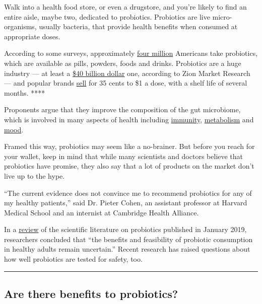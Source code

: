 Walk into a health food store, or even a drugstore, and you're likely to
find an entire aisle, maybe two, dedicated to probiotics. Probiotics are
live micro-organisms, usually bacteria, that provide health benefits
when consumed at appropriate doses.

According to some surveys, approximately
\href{https://nccih.nih.gov/research/statistics/NHIS/2012/natural-products/biotics}{four
million} Americans take probiotics, which are available as pills,
powders, foods and drinks. Probiotics are a huge industry --- at least a
\href{https://www.zionmarketresearch.com/report/probiotics-market}{\$40
billion dollar} one, according to Zion Market Research --- and popular
brands \href{https://smile.amazon.com/s?k=probiotics}{sell} for 35 cents
to \$1 a dose, with a shelf life of several months. ****

Proponents argue that they improve the composition of the gut
microbiome, which is involved in many aspects of health including
\href{https://www.ncbi.nlm.nih.gov/pubmed/27383981}{immunity},
\href{https://www.ncbi.nlm.nih.gov/pubmed/22674330}{metabolism} and
\href{https://www.ncbi.nlm.nih.gov/pubmed/27814521}{mood}.

Framed this way, probiotics may seem like a no-brainer. But before you
reach for your wallet, keep in mind that while many scientists and
doctors believe that probiotics have promise, they also say that a lot
of products on the market don't live up to the hype.

``The current evidence does not convince me to recommend probiotics for
any of my healthy patients,'' said Dr. Pieter Cohen, an assistant
professor at Harvard Medical School and an internist at Cambridge Health
Alliance.

In a \href{https://www.ncbi.nlm.nih.gov/pubmed/29581563}{review} of the
scientific literature on probiotics published in January 2019,
researchers concluded that ``the benefits and feasibility of probiotic
consumption in healthy adults remain uncertain.'' Recent research has
raised questions about how well probiotics are tested for safety, too.

\begin{center}\rule{0.5\linewidth}{\linethickness}\end{center}

\hypertarget{are-there-benefits-to-probiotics}{%
\subsection{Are there benefits to
probiotics?}\label{are-there-benefits-to-probiotics}}

